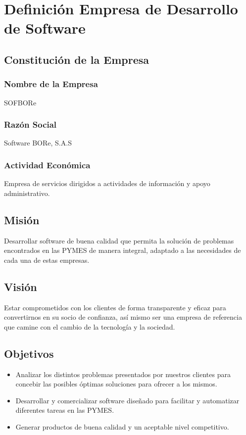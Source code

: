 \chapter{Definici\'on Empresa de Desarrollo de Software}
\section{Constituci\'on de la Empresa}
\subsection*{Nombre de la Empresa}
SOFBORe
\subsection*{Raz\'on Social}
Software BORe, S.A.S
\subsection*{Actividad Econ\'omica}
Empresa de servicios dirigidos a actividades de información y apoyo administrativo.

\section{Misi\'on}
Desarrollar software de buena calidad que permita la solución de problemas
encontrados en las PYMES de manera integral, adaptado a las necesidades de cada una 
de estas empresas.

\section{Visi\'on}
Estar comprometidos con los clientes de forma transparente y eficaz para convertirnos
en su socio de confianza, así mismo ser una empresa de referencia que camine con el 
cambio de la tecnología y la sociedad.

\section{Objetivos}
\begin{itemize}
\item Analizar los distintos problemas presentados por nuestros clientes para concebir 
las posibles óptimas soluciones para ofrecer a los mismos.
\item Desarrollar y comercializar software diseñado para facilitar y automatizar 
diferentes tareas en las PYMES.
\item Generar productos de buena calidad y un aceptable nivel competitivo.
\end{itemize}

